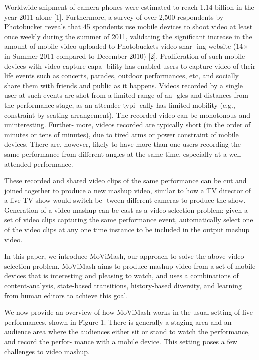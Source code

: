 \documentclass{sig-alternate}
\begin{document}
Worldwide shipment of camera phones were estimated to reach
1.14 billion in the year 2011 alone [1]. Furthermore, a survey of
over 2,500 respondents by Photobucket reveals that 45%
spondents use mobile devices to shoot video at least once weekly during the summer of 2011, validating the significant increase in
the amount of mobile video uploaded to Photobuckets video shar-
ing website (14× in Summer 2011 compared to December 2010) [2].
Proliferation of such mobile devices with video capture capa-
bility has enabled users to capture video of their life events such
as concerts, parades, outdoor performances, etc, and socially share
them with friends and public as it happens. Videos recorded by
a single user at such events are shot from a limited range of an-
gles and distances from the performance stage, as an attendee typi-
cally has limited mobility (e.g., constraint by seating arrangement).
The recorded video can be monotonous and uninteresting. Further-
more, videos recorded are typically short (in the order of minutes
or tens of minutes), due to tired arms or power constraint of mobile
devices. There are, however, likely to have more than one users
recording the same performance from different angles at the same
time, especially at a well-attended performance.\par
These recorded and shared video clips of the same performance
can be cut and joined together to produce a new mashup video,
similar to how a TV director of a live TV show would switch be-
tween different cameras to produce the show. Generation of a video
mashup can be cast as a video selection problem: given a set of
video clips capturing the same performance event, automatically
select one of the video clips at any one time instance to be included
in the output mashup video.\par
In this paper, we introduce MoViMash, our approach to solve
the above video selection problem. MoViMash aims to produce
mashup video from a set of mobile devices that is interesting and
pleasing to watch, and uses a combinations of content-analysis,
state-based transitions, history-based diversity, and learning from
human editors to achieve this goal.\par
We now provide an overview of how MoViMash works in the
usual setting of live performances, shown in Figure 1. There is
generally a staging area and an audience area where the audiences
either sit or stand to watch the performance, and record the perfor-
mance with a mobile device. This setting poses a few challenges to
video mashup.\par
\end{document}
